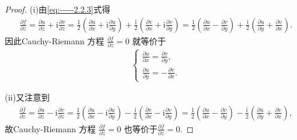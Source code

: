 \documentclass[../../main.tex]{subfiles}%
\begin{document}
\begin{proof}

(i)由\eqref{eq:-----2.2.3}式得
\begin{align*}
\frac{\partial f}{\partial \overline{z}}=\frac{\partial u}{\partial \overline{z}} + \mathrm{i}\frac{\partial v}{\partial \overline{z}}=\frac{1}{2}\left(\frac{\partial u}{\partial x}+\mathrm{i}\frac{\partial u}{\partial y}\right)+\frac{\mathrm{i}}{2}\left(\frac{\partial v}{\partial x}+\mathrm{i}\frac{\partial v}{\partial y}\right)=\frac{1}{2}\left(\frac{\partial u}{\partial x}-\frac{\partial v}{\partial y}\right)+\frac{\mathrm{i}}{2}\left(\frac{\partial u}{\partial y}+\frac{\partial v}{\partial x}\right).
\end{align*}
因此Cauchy-Riemann 方程 $\frac{\partial f}{\partial \overline{z}} = 0$ 就等价于
\begin{align*}
\begin{cases}
\frac{\partial u}{\partial x}=\frac{\partial v}{\partial y},\\
\frac{\partial u}{\partial y}=-\frac{\partial v}{\partial x}.
\end{cases}
\end{align*}

(ii)又注意到
\begin{align*}
\frac{\partial \overline{f}}{\partial z}=\frac{\partial u}{\partial z}-\mathrm{i}\frac{\partial v}{\partial z}=\frac{1}{2}\left( \frac{\partial u}{\partial x}-\mathrm{i}\frac{\partial u}{\partial y} \right) -\frac{\mathrm{i}}{2}\left( \frac{\partial v}{\partial x}-\mathrm{i}\frac{\partial v}{\partial y} \right) =\frac{1}{2}\left( \frac{\partial u}{\partial x}-\frac{\partial v}{\partial y} \right) -\frac{\mathrm{i}}{2}\left( \frac{\partial u}{\partial y}+\frac{\partial v}{\partial x} \right) ,
\end{align*}
故Cauchy-Riemann 方程 $\frac{\partial f}{\partial \overline{z}} = 0$ 也等价于$\frac{\partial \overline{f}}{\partial z}=0.$


\end{proof}
\end{document}
